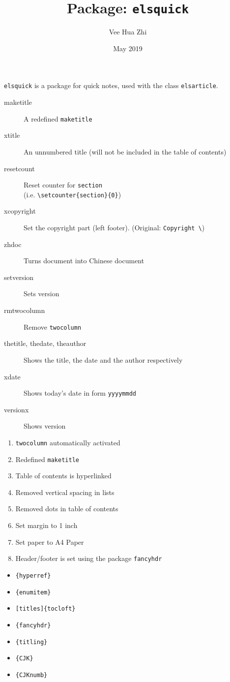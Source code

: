 \documentclass{elsarticle}
\title{Package: \texttt{elsquick}}
\author{Vee Hua Zhi}
\date{May 2019}
\begin{document}
\maketitle
{}
\texttt{elsquick} is a package for quick notes, used with the class \texttt{elsarticle}. 


\begin{description}
    \item [maketitle] A redefined \texttt{maketitle}
    \item [xtitle] An unnumbered title (will not be included in the table of contents)
    \item [resetcount] Reset counter for \texttt{section} \\(i.e. \verb!\setcounter{section}{0}!)
    \item [xcopyright] Set the copyright part (left footer). (Original: \verb!Copyright \!)
    \item [zhdoc] Turns document into Chinese document
    \item [setversion] Sets version
    \item [rmtwocolumn] Remove \texttt{twocolumn}
\end{description}

\begin{description}
    \item [thetitle, thedate, theauthor] Shows the title, the date and the author respectively
    \item [xdate] Shows today's date in form \texttt{yyyymmdd}
    \item [versionx] Shows version
\end{description}

\begin{enumerate}
    \item \texttt{twocolumn} automatically activated
    \item Redefined \texttt{maketitle}
    \item Table of contents is hyperlinked
    \item Removed vertical spacing in lists
    \item Removed dots in table of contents
    \item Set margin to 1 inch
    \item Set paper to A4 Paper
    \item Header/footer is set using the package \texttt{fancyhdr}
\end{enumerate}

\begin{itemize}
    \item \texttt{\{hyperref\}}
    \item \texttt{\{enumitem\}}
    \item \texttt{{[titles]}\{tocloft\}}
    \item \texttt{\{fancyhdr\}}
    \item \texttt{\{titling\}}
    \item \texttt{\{CJK\}}
    \item \texttt{\{CJKnumb\}}
\end{itemize}
\end{document}
